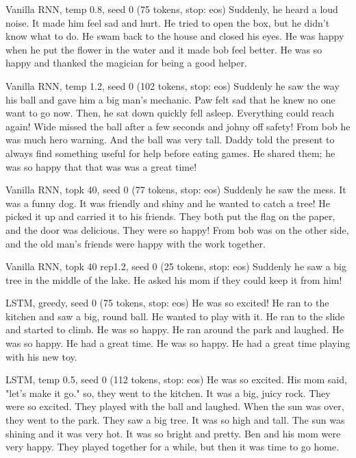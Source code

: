 \begin{modelout}{Vanilla RNN, temp 0.8, seed 0 (75 tokens, stop: eos)}
\small Suddenly, he heard a loud noise. It made him feel sad and hurt. He tried to open the box, but he didn't know what to do. He swam back to the house and closed his eyes. He was happy when he put the flower in the water and it made bob feel better. He was so happy and thanked the magician for being a good helper.
\end{modelout}

\begin{modelout}{Vanilla RNN, temp 1.2, seed 0 (102 tokens, stop: eos)}
\small Suddenly he saw the way his ball and gave him a big man's mechanic. Paw felt sad that he knew no one want to go now. Then, he sat down quickly fell asleep. Everything could reach again! Wide missed the ball after a few seconds and johny off safety! From bob he was much hero warning. And the ball was very tall. Daddy told the present to always find something useful for help before eating games. He shared them; he was so happy that that was was a great time!
\end{modelout}

\begin{modelout}{Vanilla RNN, topk 40, seed 0 (77 tokens, stop: eos)}
\small Suddenly he saw the mess. It was a funny dog. It was friendly and shiny and he wanted to catch a tree! He picked it up and carried it to his friends. They both put the flag on the paper, and the door was delicious. They were so happy! From bob was on the other side, and the old man's friends were happy with the work together.
\end{modelout}

\begin{modelout}{Vanilla RNN, topk 40 rep1.2, seed 0 (25 tokens, stop: eos)}
\small Suddenly he saw a big tree in the middle of the lake. He asked his mom if they could keep it from him!
\end{modelout}

\begin{modelout}{LSTM, greedy, seed 0 (75 tokens, stop: eos)}
\small He was so excited! He ran to the kitchen and saw a big, round ball. He wanted to play with it. He ran to the slide and started to climb. He was so happy. He ran around the park and laughed. He was so happy. He had a great time. He was so happy. He had a great time playing with his new toy.
\end{modelout}

\begin{modelout}{LSTM, temp 0.5, seed 0 (112 tokens, stop: eos)}
\small He was so excited. His mom said, "let's make it go." so, they went to the kitchen. It was a big, juicy rock. They were so excited. They played with the ball and laughed. When the sun was over, they went to the park. They saw a big tree. It was so high and tall. The sun was shining and it was very hot. It was so bright and pretty. Ben and his mom were very happy. They played together for a while, but then it was time to go home.
\end{modelout}

